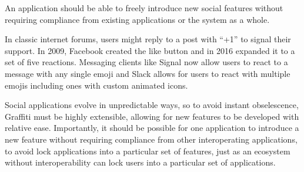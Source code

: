




\begin{requirement}
\label{requirements:autonomous-extensibility}
    An application should be able to freely introduce new social features without requiring compliance from existing applications or the system as a whole.
\end{requirement}

In classic internet forums, users might reply to a post with ``+1'' to signal their support.
In 2009, Facebook created the like button and in 2016 expanded it to a set of five reactions.
Messaging clients like Signal now allow users to react to a message with any single emoji and
Slack allows for users to react with multiple emojis including ones with custom animated icons.

Social applications evolve in unpredictable ways,
so to avoid instant obselescence, Graffiti must be highly extensible,
allowing for new features
to be developed with relative ease.
Importantly, it should be possible for one application to introduce a new feature
without requiring compliance from other interoperating applications, to avoid
lock applications into a particular set of features,
just as an ecosystem without interoperability can lock users into a
particular set of applications.

